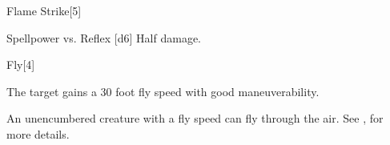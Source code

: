 \begin{spellsection}{Flame Strike}[5]
    \begin{spellheader}
    \end{spellheader}
    \begin{spellcontent}
        \begin{spelltargetinginfo}
        \end{spelltargetinginfo}
        \begin{spelleffects}
            \begin{spellattack}{Spellpower vs. Reflex}
                \spellsuccess {}[d6]
                \spellfailure Half damage.
            \end{spellattack}
        \end{spelleffects}
    \end{spellcontent}
    \begin{spellfooter}
        \spellnotes \destructivespellnotes

        \firespellnotes
        \miscastyou
    \end{spellfooter}
\end{spellsection}

\begin{spellsection}{Fly}[4]
    \begin{spellheader}
    \end{spellheader}
    \begin{spellcontent}
        \begin{spelltargetinginfo}
        \end{spelltargetinginfo}
        \begin{spelleffects}
            \spelleffect The target gains a 30 foot fly speed with good maneuverability.
            \spelldur \durshort
        \end{spelleffects}
    \end{spellcontent}
    \begin{spellfooter}
        \spellnotes An unencumbered creature with a fly speed can fly through the air. See , for more details.
        \miscastexplode
    \end{spellfooter}%
\end{spellsection}

